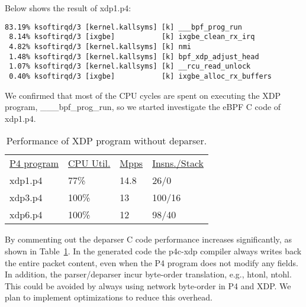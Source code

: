Below shows the result of xdp1.p4:
{\scriptsize
\begin{verbatim}
83.19% ksoftirqd/3 [kernel.kallsyms] [k] ___bpf_prog_run
 8.14% ksoftirqd/3 [ixgbe]           [k] ixgbe_clean_rx_irq
 4.82% ksoftirqd/3 [kernel.kallsyms] [k] nmi
 1.48% ksoftirqd/3 [kernel.kallsyms] [k] bpf_xdp_adjust_head
 1.07% ksoftirqd/3 [kernel.kallsyms] [k] __rcu_read_unlock
 0.40% ksoftirqd/3 [ixgbe]           [k] ixgbe_alloc_rx_buffers
\end{verbatim}
}

We confirmed that most of the CPU cycles are spent on executing the
XDP program, \_\_\_bpf\_prog\_run, so we started investigate the eBPF
C code of xdp1.p4.

\begin{table}
\centering
\small
\begin{tabular}{llll}
  \underline{P4 program} & \underline{CPU Util.} & \underline{Mpps} & \underline{Insns./Stack}\\
  xdp1.p4 &  77\% &  14.8 & 26/0 \\
  xdp3.p4 &  100\% &  13 & 100/16 \\
  xdp6.p4 &  100\% &  12 & 98/40 \\
\end{tabular}
\caption{\footnotesize Performance of XDP program without deparser.}
\label{tab:perf2}
\end{table}

By commenting out the deparser C code performance increases
significantly, as shown in Table~\ref{tab:perf2}.  In the generated
code the p4c-xdp compiler always writes back the entire packet
content, even when the P4 program does not modify any fields.  In
addition, the parser/deparser incur byte-order translation, e.g.,
htonl, ntohl.  This could be avoided by always using network
byte-order in P4 and XDP.  We plan to implement optimizations to
reduce this overhead.

